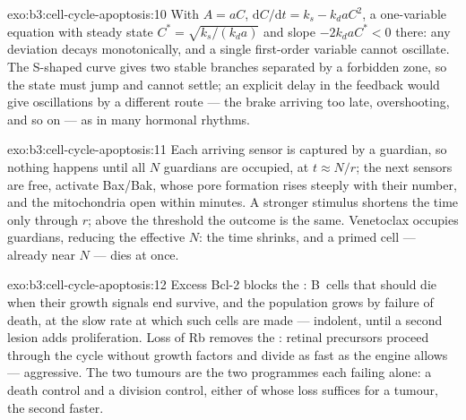 \begin{solution}{exo:b3:cell-cycle-apoptosis:10}
With $A = aC$, $\mathrm{d}C/\mathrm{d}t = k_{s} - k_{d}aC^{2}$, a
one-variable equation with steady state $C^{*} = \sqrt{k_{s}/(k_{d}a)}$
and slope $-2k_{d}aC^{*} < 0$ there: any deviation decays
monotonically, and a single first-order variable cannot oscillate. The
S-shaped curve gives two stable branches separated by a forbidden
zone, so the state must jump and cannot settle; an explicit delay in
the feedback would give oscillations by a different route --- the brake
arriving too late, overshooting, and so on --- as in many hormonal
rhythms.
\end{solution}

\begin{solution}{exo:b3:cell-cycle-apoptosis:11}
Each arriving sensor is captured by a guardian, so nothing happens
until all $N$ guardians are occupied, at $t \approx N/r$; the next
sensors are free, activate Bax/Bak, whose pore formation rises steeply
with their number, and the mitochondria open within minutes. A stronger
stimulus shortens the time only through $r$; above the threshold the
outcome is the same. Venetoclax occupies guardians, reducing the
effective $N$: the time shrinks, and a primed cell --- already near $N$
--- dies at once.
\end{solution}

\begin{solution}{exo:b3:cell-cycle-apoptosis:12}
Excess Bcl-2 blocks the : B~cells that should die when
their growth signals end survive, and the population grows by failure
of death, at the slow rate at which such cells are made --- indolent,
until a second lesion adds proliferation. Loss of Rb removes the
: retinal precursors proceed through the cycle
without growth factors and divide as fast as the engine allows ---
aggressive. The two tumours are the two programmes each failing alone:
a death control and a division control, either of whose loss suffices
for a tumour, the second faster.
\end{solution}

